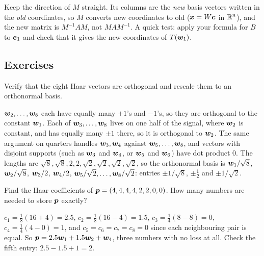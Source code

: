\begin{trap}
Keep the direction of $M$ straight. Its columns are the \emph{new} basis vectors written in the
\emph{old} coordinates, so $M$ converts new coordinates to old ($\boldsymbol{x}=W\boldsymbol{c}$ in $\mathbb{R}^n$), and the new matrix
is $M^{-1}AM$, not $MAM^{-1}$. A quick test: apply your formula for $B$ to $\boldsymbol{e}_1$ and check that it
gives the new coordinates of $T(\boldsymbol{w}_1)$.
\end{trap}

\subsection{Exercises}

\begin{exercise}\label{exr:u35-haar}
Verify that the eight Haar vectors are orthogonal and rescale them to an orthonormal basis.
\end{exercise}
\begin{solution}
$\boldsymbol{w}_2,\dots,\boldsymbol{w}_8$ each have equally many $+1$'s and $-1$'s, so they are orthogonal to the constant
$\boldsymbol{w}_1$. Each of $\boldsymbol{w}_3,\dots,\boldsymbol{w}_8$ lives on one half of the signal, where $\boldsymbol{w}_2$ is constant, and has
equally many $\pm1$ there, so it is orthogonal to $\boldsymbol{w}_2$. The same argument on quarters handles
$\boldsymbol{w}_3,\boldsymbol{w}_4$ against $\boldsymbol{w}_5,\dots,\boldsymbol{w}_8$, and vectors with disjoint supports (such as $\boldsymbol{w}_3$ and $\boldsymbol{w}_4$,
or $\boldsymbol{w}_5$ and $\boldsymbol{w}_6$) have dot product $0$. The lengths are $\sqrt8,\sqrt8,2,2,\sqrt2,\sqrt2,\sqrt2,\sqrt2$,
so the orthonormal basis is $\boldsymbol{w}_1/\sqrt8$, $\boldsymbol{w}_2/\sqrt8$, $\boldsymbol{w}_3/2$, $\boldsymbol{w}_4/2$, $\boldsymbol{w}_5/\sqrt2,\dots,\boldsymbol{w}_8/\sqrt2$:
entries $\pm1/\sqrt8$, $\pm\tfrac12$ and $\pm1/\sqrt2$.
\end{solution}

\begin{exercise}\label{exr:u35-lossless}
Find the Haar coefficients of $\boldsymbol{p}=(4,4,4,4,2,2,0,0)$. How many numbers are needed to store $\boldsymbol{p}$
exactly?
\end{exercise}
\begin{solution}
$c_1=\tfrac18(16+4)=2.5$, $c_2=\tfrac18(16-4)=1.5$, $c_3=\tfrac14(8-8)=0$, $c_4=\tfrac14(4-0)=1$, and
$c_5=c_6=c_7=c_8=0$ since each neighbouring pair is equal. So $\boldsymbol{p}=2.5\boldsymbol{w}_1+1.5\boldsymbol{w}_2+\boldsymbol{w}_4$, three numbers
with no loss at all. Check the fifth entry: $2.5-1.5+1=2$.
\end{solution}

